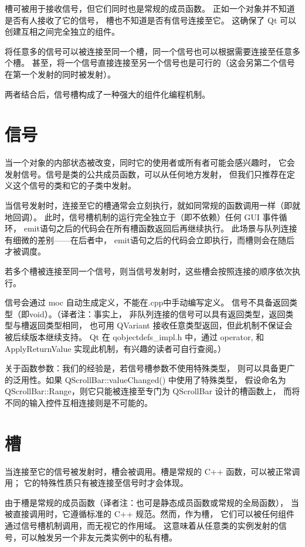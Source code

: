 槽可被用于接收信号，但它们同时也是常规的成员函数。
正如一个对象并不知道是否有人接收了它的信号，
槽也不知道是否有信号连接至它。
这确保了 Qt 可以创建互相之间完全独立的组件。

将任意多的信号可以被连接至同一个槽，同一个信号也可以根据需要连接至任意多个槽。
甚至，将一个信号直接连接至另一个信号也是可行的（这会另第二个信号在第一个发射的同时被发射）。

两者结合后，信号槽构成了一种强大的组件化编程机制。

\section{信号}

当一个对象的内部状态被改变，同时它的使用者或所有者可能会感兴趣时，
它会发射信号。信号是类的公共成员函数，可以从任何地方发射，
但我们只推荐在定义这个信号的类和它的子类中发射。

当信号发射时，连接至它的槽通常会立刻执行，就如同常规的函数调用一样（即就地回调）。
此时，信号槽机制的运行完全独立于（即不依赖）任何 GUI 事件循环，
emit语句之后的代码会在所有槽函数返回后再继续执行。
此场景与队列连接有细微的差别——在后者中，
emit语句之后的代码会立即执行，而槽则会在随后才被调度。

若多个槽被连接至同一个信号，则当信号发射时，这些槽会按照连接的顺序依次执行。

信号会通过 moc 自动生成定义，不能在.cpp中手动编写定义。
信号不具备返回类型（即void）。（译者注：事实上，
非队列连接的信号可以具有返回类型，返回类型与槽返回类型相同，
也可用 QVariant 接收任意类型返回，但此机制不保证会被后续版本继续支持。
Qt 在 qobjectdefs\_impl.h 中，通过 operator, 
和 ApplyReturnValue 实现此机制，有兴趣的读者可自行查阅。）

关于函数参数：我们的经验是，若信号槽参数不使用特殊类型，
则可以具备更广的泛用性。如果 QScrollBar::valueChanged() 中使用了特殊类型，
假设命名为QScrollBar::Range，则它只能被连接至专门为 QScrollBar 设计的槽函数上，
而将不同的输入控件互相连接则是不可能的。


\section{槽}

当连接至它的信号被发射时，槽会被调用。槽是常规的 C++ 函数，可以被正常调用；
它的特殊性质只有被连接至信号时才会体现。

由于槽是常规的成员函数（译者注：也可是静态成员函数或常规的全局函数），
当被直接调用时，它遵循标准的 C++ 规范。然而，作为槽，
它们可以被任何组件通过信号槽机制调用，而无视它的作用域。
这意味着从任意类的实例发射的信号，可以触发另一个非友元类实例中的私有槽。

